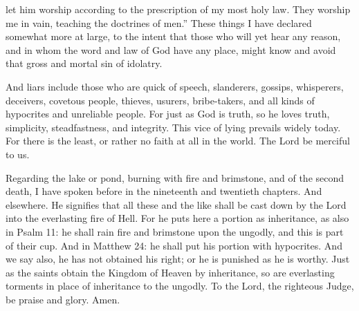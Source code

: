let him worship according to the prescription of my most holy law. They worship me in vain, teaching the doctrines of men.” These things I have declared somewhat more at large, to the intent that those who will yet hear any reason, and in whom the word and law of God have any place, might know and avoid that gross and mortal sin of idolatry.

And liars include those who are quick of speech, slanderers, gossips, whisperers, deceivers, covetous people, thieves, usurers, bribe-takers, and all kinds of hypocrites and unreliable people. For just as God is truth, so he loves truth, simplicity, steadfastness, and integrity. This vice of lying prevails widely today. For there is the least, or rather no faith at all in the world. The Lord be merciful to us.

Regarding the lake or pond, burning with fire and brimstone, and of the second death, I have spoken before in the nineteenth and twentieth chapters. And elsewhere. He signifies that all these and the like shall be cast down by the Lord into the everlasting fire of Hell. For he puts here a portion as inheritance, as also in Psalm 11: he shall rain fire and brimstone upon the ungodly, and this is part of their cup. And in Matthew 24: he shall put his portion with hypocrites. And we say also, he has not obtained his right; or he is punished as he is worthy. Just as the saints obtain the Kingdom of Heaven by inheritance, so are everlasting torments in place of inheritance to the ungodly. To the Lord, the righteous Judge, be praise and glory. Amen.
